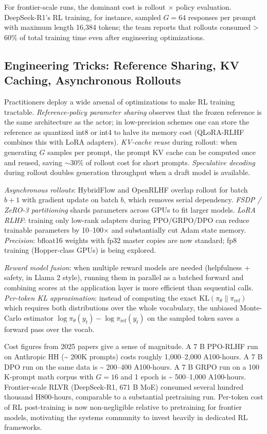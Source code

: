 For frontier-scale runs, the dominant cost is rollout × policy evaluation. DeepSeek-R1's RL training, for instance, sampled \(G = 64\) responses per prompt with maximum length 16,384 tokens; the team reports that rollouts consumed \textgreater{} 60\% of total training time even after engineering optimizations.

\subsection{Engineering Tricks: Reference Sharing, KV Caching, Asynchronous Rollouts}\label{engineering-tricks-reference-sharing-kv-caching-asynchronous-rollouts}

Practitioners deploy a wide arsenal of optimizations to make RL training tractable. \emph{Reference-policy parameter sharing} observes that the frozen reference is the same architecture as the actor; in low-precision schemes one can store the reference as quantized int8 or int4 to halve its memory cost (QLoRA-RLHF combines this with LoRA adapters). \emph{KV-cache reuse} during rollout: when generating \(G\) samples per prompt, the prompt KV cache can be computed once and reused, saving \(\sim 30\)\% of rollout cost for short prompts. \emph{Speculative decoding} during rollout doubles generation throughput when a draft model is available.

\emph{Asynchronous rollouts}: HybridFlow and OpenRLHF overlap rollout for batch \(b+1\) with gradient update on batch \(b\), which removes serial dependency. \emph{FSDP / ZeRO-3 partitioning} shards parameters across GPUs to fit larger models. \emph{LoRA RLHF}: training only low-rank adapters during PPO/GRPO/DPO can reduce trainable parameters by 10--100× and substantially cut Adam state memory. \emph{Precision}: bfloat16 weights with fp32 master copies are now standard; fp8 training (Hopper-class GPUs) is being explored.

\emph{Reward model fusion}: when multiple reward models are needed (helpfulness + safety, in Llama 2 style), running them in parallel as a batched forward and combining scores at the application layer is more efficient than sequential calls. \emph{Per-token KL approximation}: instead of computing the exact \(\mathrm{KL}(\pi_\theta \| \pi_{\text{ref}})\) which requires both distributions over the whole vocabulary, the unbiased Monte-Carlo estimator \(\log \pi_\theta(y_t) - \log \pi_{\text{ref}}(y_t)\) on the sampled token saves a forward pass over the vocab.

Cost figures from 2025 papers give a sense of magnitude. A 7 B PPO-RLHF run on Anthropic HH (\textasciitilde{} 200K prompts) costs roughly 1,000--2,000 A100-hours. A 7 B DPO run on the same data is \textasciitilde{} 200--400 A100-hours. A 7 B GRPO run on a 100 K-prompt math corpus with \(G = 16\) and 1 epoch is \textasciitilde{} 500--1,000 A100-hours. Frontier-scale RLVR (DeepSeek-R1, 671 B MoE) consumed several hundred thousand H800-hours, comparable to a substantial pretraining run. Per-token cost of RL post-training is now non-negligible relative to pretraining for frontier models, motivating the systems community to invest heavily in dedicated RL frameworks.

